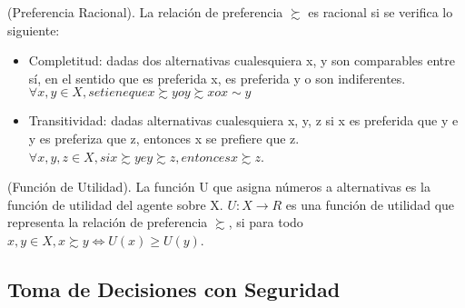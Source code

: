 \begin{defn}(Preferencia Racional). La relación de preferencia $\succsim$ es racional si se verifica lo siguiente:
	\begin{itemize}
		\item Completitud: dadas dos alternativas cualesquiera x, y  son comparables entre sí, en el sentido que es preferida x, es preferida y o son indiferentes.\\
		 $\forall x, y \in X, se tiene que x\succsim y o y\succsim x o x \sim y $
		\item Transitividad: dadas alternativas cualesquiera x, y, z si x es preferida que y e y es preferiza que z, entonces x se prefiere que z.\\
		 $\forall x, y, z\in X, si x\succsim y e y\succsim z, entonces x\succsim z$.
	\end{itemize}
\end{defn}

\begin{defn}(Función de Utilidad). La función U que asigna números a alternativas es la función de utilidad del agente sobre X. $U: X\longrightarrow R$ es una función de utilidad que representa la relación de preferencia $\succsim$, si para todo $x, y\in X, x\succsim y \Leftrightarrow U(x)\geq U(y)$.
\end{defn}

\subsection{Toma de Decisiones con Seguridad }

